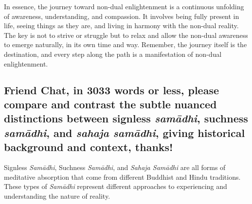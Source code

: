 \documentclass[12pt,openany]{book}
\begin{document}
In essence, the journey toward non-dual enlightenment is a continuous unfolding of awareness, understanding, and compassion. It involves being fully present in life, seeing things as they are, and living in harmony with the non-dual reality. The key is not to strive or struggle but to relax and allow the non-dual awareness to emerge naturally, in its own time and way. Remember, the journey itself is the destination, and every step along the path is a manifestation of non-dual enlightenment.

\begin{figure}[h]
    \centering
\end{figure}

\subsection*{Friend Chat, in 3033 words or less, please compare and contrast the subtle nuanced distinctions between signless \textit{samādhi}, suchness \textit{samādhi}, and \textit{sahaja samādhi}, giving historical background and context, thanks!}

Signless \textit{Samādhi}, Suchness \textit{Samādhi}, and \textit{Sahaja Samādhi} are all forms of meditative absorption that come from different Buddhist and Hin\-du traditions. These types of \textit{Samādhi} represent different approaches to experiencing and understanding the nature of reality.
\end{document}
